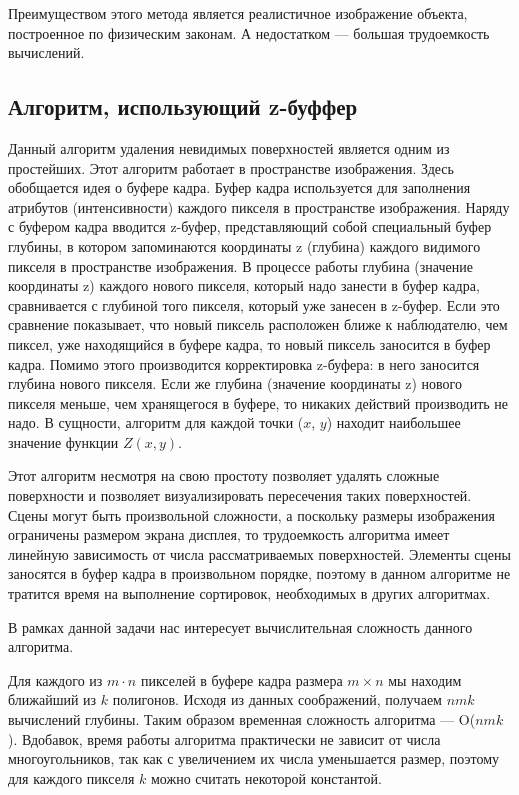 Преимуществом этого метода является реалистичное изображение объекта, построенное по физическим законам. А недостатком --- большая трудоемкость вычислений.

\subsection{Алгоритм, использующий z-буффер}

Данный алгоритм удаления невидимых поверхностей является одним из простейших. Этот алгоритм работает в пространстве изображения. Здесь обобщается идея о буфере кадра. Буфер кадра используется для заполнения атрибутов (интенсивности) каждого пикселя в пространстве изображения. Наряду с буфером кадра вводится z-буфер, представляющий собой специальный буфер глубины, в котором запоминаются координаты z (глубина) каждого видимого пикселя в пространстве изображения. В процессе работы глубина (значение координаты z) каждого нового пикселя, который надо занести в буфер кадра, сравнивается с глубиной того пикселя, который уже занесен в z-буфер. Если это сравнение показывает, что новый пиксель расположен ближе к наблюдателю, чем пиксел, уже находящийся в буфере кадра, то новый пиксель заносится в буфер кадра. Помимо этого производится корректировка z-буфера: в него заносится глубина нового пикселя. Если же глубина (значение координаты z) нового пикселя меньше, чем хранящегося в буфере, то никаких действий производить не надо. В сущности, алгоритм для каждой точки ($x$, $y$) находит наибольшее значение функции $Z(x, y)$.

Этот алгоритм несмотря на свою простоту позволяет удалять сложные поверхности и позволяет визуализировать пересечения таких поверхностей. Сцены могут быть произвольной сложности, а поскольку размеры изображения ограничены размером экрана дисплея, то трудоемкость алгоритма имеет линейную зависимость от числа рассматриваемых поверхностей. Элементы сцены заносятся в буфер кадра в произвольном порядке, поэтому в данном алгоритме не тратится время на выполнение сортировок, необходимых в других алгоритмах.

В рамках данной задачи нас интересует вычислительная сложность данного алгоритма.

Для каждого из $m\cdot n$ пикселей в буфере кадра размера $m\times n$ мы находим ближайший из $k$ полигонов. Исходя из данных соображений, получаем $nmk$ вычислений глубины. Таким образом временная сложность алгоритма --- O($nmk$). Вдобавок, время работы алгоритма практически не зависит от числа многоугольников, так как с увеличением их числа уменьшается размер, поэтому для каждого пикселя $k$ можно считать некоторой константой.

